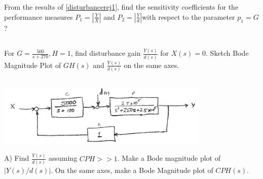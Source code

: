 \documentclass{article}	%
\begin{document}
\subsection{}
 From the results of \ref{disturbancerej1}, find the sensitivity coefficients for the performance measures $P_1=|\frac{Y}{X}|$ and $P_2=|\frac{Y}{d}|$with respect to the parameter $p_1 = G$?\\[0.15in]

%
%
%
%



\subsection{} For $G = \frac{500}{s+270}, H=1$, find disturbance gain $\frac{Y(s)}{d(s)}$ for $X(s)=0$.  Sketch Bode Magnitude Plot of $GH(s)$ and $\frac{Y(s)}{d(s)}$ on the same axes.

%
%
%
%

\subsection{}
 \includegraphics[width=4.0in]{00470a.png}

A) Find $\frac{Y(s)}{d(s)}$ assuming $CPH>>1$. Make a Bode magnitude plot of $|Y(s)/d(s)|$.
On the same axes, make a Bode Magnitude plot of $CPH(s)$.
\end{document}
